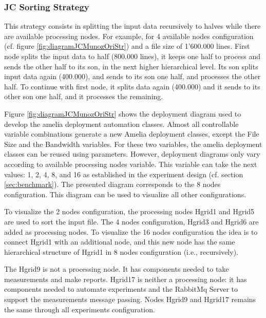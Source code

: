 \subsubsection{JC Sorting Strategy}
\label{subsubsec:ameliaOriginalStrategy}
This strategy consists in splitting the input data recursively to halves while there are available processing nodes. For example, for 4 available nodes configuration (cf. figure \ref{fig:diagramJCMunozOriStr})  and a file size of 1'600.000 lines. First node splits the input data to half (800.000 lines), it keeps one half to process and sends the other half to its son, in the next higher hierarchical level. Its son splits input data again (400.000), and  sends to its son one half, and processes the other half. To continue with first node, it splits data again (400.000) and it sends to its other son one half, and it processes the remaining.

Figure \ref{fig:diagramJCMunozOriStr} shows the deployment diagram used to develop the amelia deployment automation classes. Almost all controllable variable combinations generate a new Amelia deployment classes, except the File Size and the Bandwidth variables. For these two variables, the amelia deployment classes can be reused using parameters. However, deployment diagrams only vary according to available processing nodes variable. This variable can take the next values: 1, 2, 4, 8, and 16 as established in the experiment design (cf. section \ref{sec:benchmark}). The presented diagram corresponds to the 8 nodes configuration. This diagram can be used to visualize all other configurations. 

To visualize the 2 nodes configuration, the processing nodes Hgrid1 and Hgrid5 are used to sort the input file. The 4 nodes configuration, Hgrid3 and Hgrid6 are added as processing nodes. To visualize the 16 nodes configuration the idea is to connect Hgrid1 with an additional node, and this new node has the same hierarchical structure of Hgrid1 in 8 nodes configuration (i.e., recursively). 

The Hgrid9 is not a processing node. It has components needed to take measurements and make reports. Hgrid17 is neither a processing node: it has components needed to automate experiments and the RabbitMq Server to support the measurements message passing. Nodes Hgrid9 and Hgrid17 remains the same through all experiments configuration.


